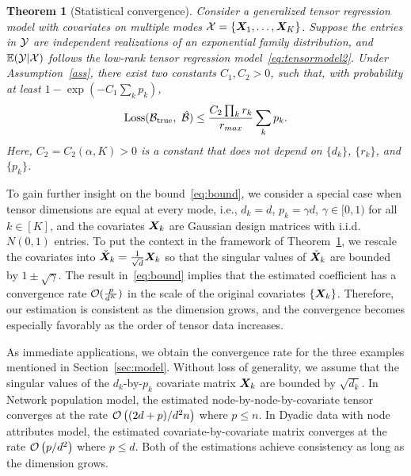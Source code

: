 \documentclass{article}
\theoremstyle{plain}
\newtheorem{thm}{Theorem}[section]
\theoremstyle{definition}
\begin{document}
\vspace{.1cm}  
\begin{thm}[Statistical convergence]\label{thm:main}
Consider a generalized tensor regression model with covariates on multiple modes $\mathcal{X}=\{\bm X_1,\ldots,\bm X_K\}$. Suppose the entries in $\mathcal{Y}$ are independent realizations of an exponential family distribution, and $\mathbb{E}(\mathcal{Y}|\mathcal{X})$ follows the low-rank tensor regression model~\eqref{eq:tensormodel2}. Under Assumption~\ref{ass}, there exist two constants $C_1, C_2>0$, such that, with probability at least $1-\exp(-C_1\sum_k p_k)$, 
\vspace{-.05cm}
\begin{equation}\label{eq:bound}
\text{Loss}(\mathcal{B}_{\text{true}},\ \hat {\mathcal{B}}) \leq \frac{ C_{2}\prod_kr_k}{r_{max}}\sum_{k} p_{k}.
\end{equation}
\vspace{-.05cm}
Here, $C_2=C_2(\alpha, K)>0$ is a constant that does not depend on $\{d_k\}$, $\{r_k\}$, and $\{p_k\}$. 
\end{thm}

To gain further insight on the bound~\eqref{eq:bound}, we consider a special case when tensor dimensions are equal at every mode, i.e., $d_k=d$, $p_k=\gamma d$, $\gamma\in [0,1)$ for all $k\in[K]$, and the covariates $\bm X_k$ are Gaussian design matrices with i.i.d.\ $N(0,1)$ entries. To put the context in the framework of Theorem~\ref{thm:main}, we rescale the covariates into $\check {\bm X}_k={1\over \sqrt{d}}\bm X_k$ so that the singular values of $\check {\bm X}_k$ are bounded by $1\pm \sqrt{\gamma}$. The result in~\eqref{eq:bound} implies that the estimated coefficient has a convergence rate $\mathcal{O}({p\over d^K})$ in the scale of the original covariates $\{\bm X_k\}$. Therefore, our estimation is consistent as the dimension grows, and the convergence becomes especially favorably as the order of tensor data increases. 

As immediate applications, we obtain the convergence rate for the three examples mentioned in Section~\ref{sec:model}. Without loss of generality, we assume that the singular values of the $d_k$-by-$p_k$ covariate matrix $\bm X_k$ are bounded by $\sqrt{d_k}$. In Network population model, the estimated node-by-node-by-covariate tensor converges at the rate $\mathcal{O}\left({(2d+p) / d^2n}\right)$ where $p\leq n$. In Dyadic data with node attributes model, the estimated covariate-by-covariate matrix converges at the rate $\mathcal{O}\left({p/ d^2}\right)$ where $p\leq d$.  Both of the estimations achieve consistency as long as the dimension grows.  
\end{document}
